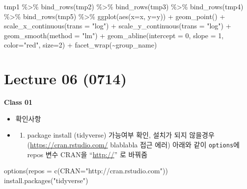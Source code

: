 \documentclass[
]{book}
\newenvironment{Shaded}{\begin{snugshade}}{\end{snugshade}}
\newcommand{\AttributeTok}[1]{\textcolor[rgb]{0.77,0.63,0.00}{#1}}
\newcommand{\DecValTok}[1]{\textcolor[rgb]{0.00,0.00,0.81}{#1}}
\newcommand{\FunctionTok}[1]{\textcolor[rgb]{0.00,0.00,0.00}{#1}}
\newcommand{\NormalTok}[1]{#1}
\newcommand{\SpecialCharTok}[1]{\textcolor[rgb]{0.00,0.00,0.00}{#1}}
\newcommand{\StringTok}[1]{\textcolor[rgb]{0.31,0.60,0.02}{#1}}
\providecommand{\tightlist}{%
  \setlength{\itemsep}{0pt}\setlength{\parskip}{0pt}}
\begin{document}
\begin{Shaded}
\begin{Highlighting}[]
\NormalTok{tmp1 }\SpecialCharTok{\%\textgreater{}\%} 
  \FunctionTok{bind\_rows}\NormalTok{(tmp2) }\SpecialCharTok{\%\textgreater{}\%} 
  \FunctionTok{bind\_rows}\NormalTok{(tmp3) }\SpecialCharTok{\%\textgreater{}\%} 
  \FunctionTok{bind\_rows}\NormalTok{(tmp4) }\SpecialCharTok{\%\textgreater{}\%} 
  \FunctionTok{bind\_rows}\NormalTok{(tmp5) }\SpecialCharTok{\%\textgreater{}\%} 
  \FunctionTok{ggplot}\NormalTok{(}\FunctionTok{aes}\NormalTok{(}\AttributeTok{x=}\NormalTok{x, }\AttributeTok{y=}\NormalTok{y)) }\SpecialCharTok{+}
    \FunctionTok{geom\_point}\NormalTok{() }\SpecialCharTok{+}
    \FunctionTok{scale\_x\_continuous}\NormalTok{(}\AttributeTok{trans =} \StringTok{"log"}\NormalTok{) }\SpecialCharTok{+}
    \FunctionTok{scale\_y\_continuous}\NormalTok{(}\AttributeTok{trans =} \StringTok{"log"}\NormalTok{) }\SpecialCharTok{+}
    \FunctionTok{geom\_smooth}\NormalTok{(}\AttributeTok{method =} \StringTok{"lm"}\NormalTok{) }\SpecialCharTok{+}
    \FunctionTok{geom\_abline}\NormalTok{(}\AttributeTok{intercept =} \DecValTok{0}\NormalTok{, }\AttributeTok{slope =} \DecValTok{1}\NormalTok{, }\AttributeTok{color=}\StringTok{"red"}\NormalTok{, }\AttributeTok{size=}\DecValTok{2}\NormalTok{) }\SpecialCharTok{+}
    \FunctionTok{facet\_wrap}\NormalTok{(}\SpecialCharTok{\textasciitilde{}}\NormalTok{group\_name)}
\end{Highlighting}
\end{Shaded}

\hypertarget{lecture-06-0714}{%
\section{Lecture 06 (0714)}\label{lecture-06-0714}}

\textbf{Class 01}

\begin{itemize}
\item
  확인사항
\item
  \begin{enumerate}
  \def\labelenumi{\arabic{enumi})}
  \tightlist
  \item
    package install (tidyverse) 가능여부 확인, 설치가 되지 않을경우 (\url{https://cran.rstudio.com/} blablabla 접근 에러) 아래와 같이 \texttt{options}에 repos 변수 CRAN을 ``\url{http://}'' 로 바꿔줌
  \end{enumerate}
\end{itemize}

\begin{Shaded}
\begin{Highlighting}[]

\FunctionTok{options}\NormalTok{(}\AttributeTok{repos =} \FunctionTok{c}\NormalTok{(}\AttributeTok{CRAN=}\StringTok{"http://cran.rstudio.com"}\NormalTok{))}
\FunctionTok{install.packages}\NormalTok{(}\StringTok{"tidyverse"}\NormalTok{)}
\end{Highlighting}
\end{Shaded}
\end{document}
